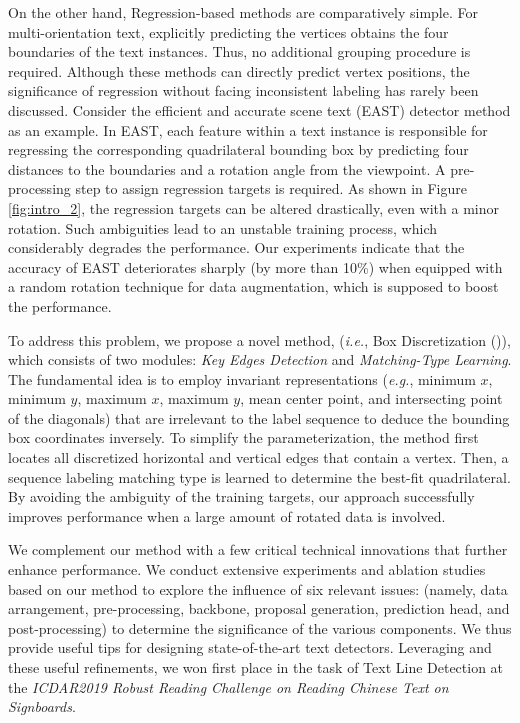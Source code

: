 On the other hand, Regression-based methods \cite{zhu2018sliding,liu2017deep,xue2019msr,liao2018rotation,ma2018arbitrary,liao2018textboxes++,he2018end,zhou2017east,he2017deep} are comparatively simple.
For multi-orientation text, explicitly predicting the vertices obtains the four boundaries of the text instances. Thus, no additional grouping procedure is required. Although these methods can directly predict vertex positions, the significance of regression without facing inconsistent labeling has rarely been discussed. Consider the efficient and accurate scene text (EAST) detector \cite{zhou2017east} method as an example. In EAST, each feature within a text instance is responsible for regressing the corresponding quadrilateral bounding box by predicting four distances to the boundaries and a rotation angle from the viewpoint.
A pre-processing step to assign regression targets is required. As shown in Figure \ref{fig:intro_2}, the regression targets can be altered drastically, even with a minor rotation. Such ambiguities lead to an unstable training process, which considerably degrades the performance. Our experiments indicate that the accuracy of EAST \cite{zhou2017east} 
deteriorates 
sharply (by more than 10\%) when equipped with a random rotation technique for data augmentation, which is supposed to boost the performance.



To address this problem, we propose a novel method, (\textit{i.e.}, \Orderless Box Discretization (\Ours)), which consists of two modules: \textit{Key Edges Detection} and \textit{Matching-Type Learning}. The fundamental idea is to employ invariant representations (\textit{e.g.}, minimum $x$, minimum $y$, maximum $x$, maximum $y$, mean center point, and intersecting point of the diagonals) that are irrelevant to the label sequence to deduce the bounding box coordinates inversely. To simplify the parameterization, the \Ours method first locates all discretized horizontal and vertical edges that contain a vertex. Then, a sequence labeling matching type is learned to determine the best-fit quadrilateral. By avoiding the ambiguity of the training targets, our approach successfully improves performance when a large amount of rotated data is involved. 


We complement our method with a few critical technical innovations that further enhance performance. We conduct extensive experiments and ablation studies based on our method to explore the influence of six relevant issues: 
(namely, data arrangement, pre-processing, backbone, proposal generation, prediction head, and post-processing) to determine the significance of the various components. 
We
thus 
provide useful tips for designing state-of-the-art text detectors. Leveraging \Ours and these useful refinements, we won first place in the task of Text Line Detection at the \textit{ICDAR2019 Robust Reading Challenge on Reading Chinese Text on Signboards}.


